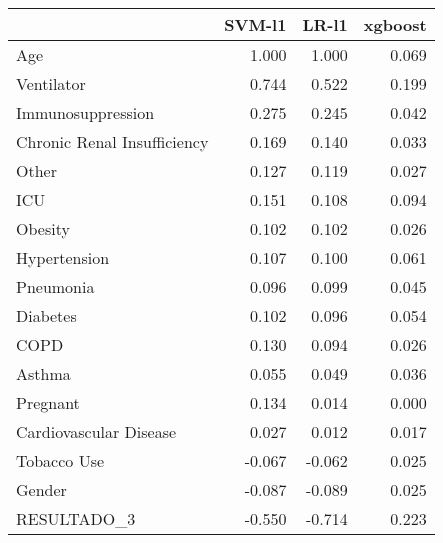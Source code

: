 \begin{tabular}{lrrr}
\toprule
{} &  SVM-l1 &  LR-l1 &  xgboost \\
\midrule
Age                         &   1.000 &  1.000 &    0.069 \\
Ventilator                  &   0.744 &  0.522 &    0.199 \\
Immunosuppression           &   0.275 &  0.245 &    0.042 \\
Chronic Renal Insufficiency &   0.169 &  0.140 &    0.033 \\
Other                       &   0.127 &  0.119 &    0.027 \\
ICU                         &   0.151 &  0.108 &    0.094 \\
Obesity                     &   0.102 &  0.102 &    0.026 \\
Hypertension                &   0.107 &  0.100 &    0.061 \\
Pneumonia                   &   0.096 &  0.099 &    0.045 \\
Diabetes                    &   0.102 &  0.096 &    0.054 \\
COPD                        &   0.130 &  0.094 &    0.026 \\
Asthma                      &   0.055 &  0.049 &    0.036 \\
Pregnant                    &   0.134 &  0.014 &    0.000 \\
Cardiovascular Disease      &   0.027 &  0.012 &    0.017 \\
Tobacco Use                 &  -0.067 & -0.062 &    0.025 \\
Gender                      &  -0.087 & -0.089 &    0.025 \\
RESULTADO\_3                 &  -0.550 & -0.714 &    0.223 \\
\bottomrule
\end{tabular}
